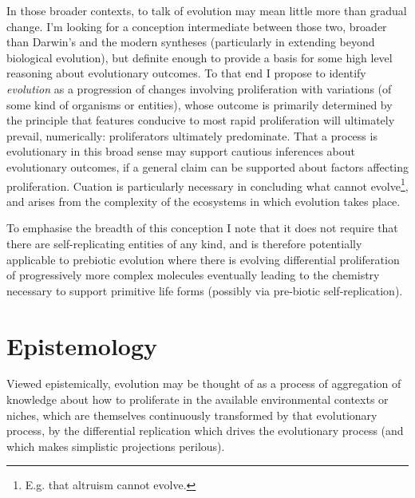 In those broader contexts, to talk of evolution may mean little more than gradual change.
I'm looking for a conception intermediate between those two, broader than Darwin's and the modern syntheses (particularly in extending beyond biological evolution), but definite enough to provide a basis for some high level reasoning about evolutionary outcomes.
To that end I propose to identify \emph{evolution} as a progression of changes involving proliferation with variations (of some kind of organisms or entities), whose outcome is primarily determined by the principle that features conducive to most rapid proliferation will ultimately prevail, numerically: proliferators ultimately predominate.
That a process is evolutionary in this broad sense may support cautious inferences about evolutionary outcomes, if a general claim can be supported about factors affecting proliferation.
Cuation is particularly necessary in concluding what cannot evolve\footnote{E.g. that altruism cannot evolve.}, and arises from the complexity of the ecosystems in which evolution takes place.

To emphasise the breadth of this conception I note that it does not require that there are self-replicating entities of any kind, and is therefore potentially applicable to prebiotic evolution where there is evolving differential proliferation of progressively more complex molecules eventually leading to the chemistry necessary to support primitive life forms (possibly via pre-biotic self-replication). 

\section{Epistemology}

Viewed epistemically, evolution may be thought of as a process of aggregation of knowledge about how to proliferate in the available environmental contexts or niches, which are themselves continuously transformed by that evolutionary process, by the differential replication which drives the evolutionary process (and which makes simplistic projections perilous).

